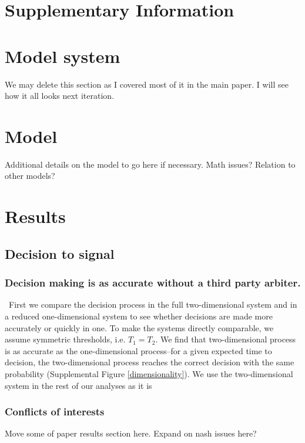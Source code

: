 \documentclass{article}
\begin{document}
\pagebreak
\nocite{*}



\appendix
\section*{Supplementary Information}
\renewcommand{\thesubsection}{\Alph{subsection}.}

\section*{Model system}
\label{empirical}
We may delete this section as I covered most of it in the main paper. I will see how it all looks next iteration.

\section*{Model}
\label{modeldetails}
Additional details on the model to go here if necessary. Math issues? Relation to other models?

\section*{Results}
\subsection*{Decision to signal}
\subsubsection*{Decision making is as accurate without a third party arbiter. }
\label{onevstwoD}
\ First we compare the decision process in the full two-dimensional system and in a reduced one-dimensional system to see whether decisions are made more accurately or quickly in one. To make the systems directly comparable, we assume symmetric thresholds, i.e. $T_1=T_2$.  We find that two-dimensional process is as accurate as the one-dimensional process--for a given expected time to decision, the two-dimensional process reaches the correct decision with the same probability (Supplemental Figure \ref{dimensionality}). We use the two-dimensional system in the rest of our analyses as it is  

\subsubsection*{Conflicts of interests}
Move some of paper results section here. Expand on nash issues here?
\end{document}
